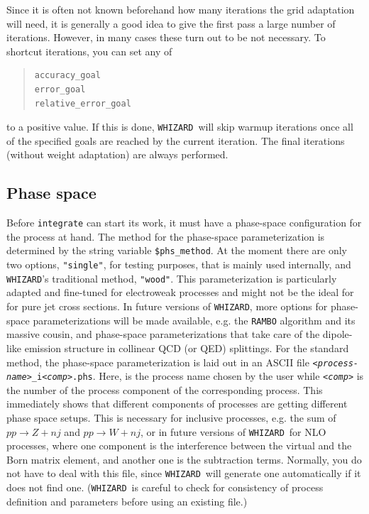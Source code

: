 \documentclass[12pt]{book}
\newcommand{\ttt}[1]{\texttt{#1}}
\newcommand{\whizard}{\ttt{WHIZARD}}
\begin{document}
Since it is often not known beforehand how many iterations the grid
adaptation will need, it is generally a good idea to give the first
pass a large number of iterations.  However, in many cases these turn
out to be not necessary.  To shortcut iterations, you can set any of
\begin{quote}
\begin{footnotesize}
\begin{verbatim}
accuracy_goal
error_goal
relative_error_goal
\end{verbatim}
\end{footnotesize}
\end{quote}
to a positive value.  If this is done, \whizard\ will skip warmup
iterations once all of the specified goals are reached by the current
iteration.  The final iterations (without weight adaptation) are
always performed.


\subsection{Phase space}

Before \ttt{integrate} can start its work, it must have a phase-space
configuration for the process at hand.  The method for the phase-space
parameterization is determined by the string variable
\ttt{\$phs\_method}. At the moment there are only two options,
\ttt{"single"}, for testing purposes, that is mainly used internally,
and \whizard's traditional method, \ttt{"wood"}. This parameterization
is particularly adapted and fine-tuned for electroweak processes and
might not be the ideal for for pure jet cross sections. In future
versions of \whizard, more options for phase-space parameterizations
will be made available, e.g. the \ttt{RAMBO} algorithm and its massive
cousin, and phase-space parameterizations that take care of the
dipole-like emission structure in collinear QCD (or QED) splittings.
For the standard method, the phase-space parameterization is laid out
in an ASCII file \ttt{\textit{<process-name>\_}i\textit{<comp>}.phs}.
Here, \ttt{{\em <process-name>}} is the process name chosen by the
user while \ttt{{\em <comp>}} is the number of the process component
of the corresponding process. This immediately shows that different
components of processes are getting different phase space setups. This
is necessary for inclusive processes, e.g. the sum of $pp \to Z + nj$
and $pp \to W + nj$, or in future versions of \whizard\ for NLO
processes, where one component is the interference between the virtual
and the Born matrix element, and another one is the subtraction terms.
Normally, you do not have to deal with this file, since \whizard\ will
generate one automatically if it does not find one. (\whizard\ is
careful to check for consistency of process definition and parameters
before using an existing file.)
\end{document}
